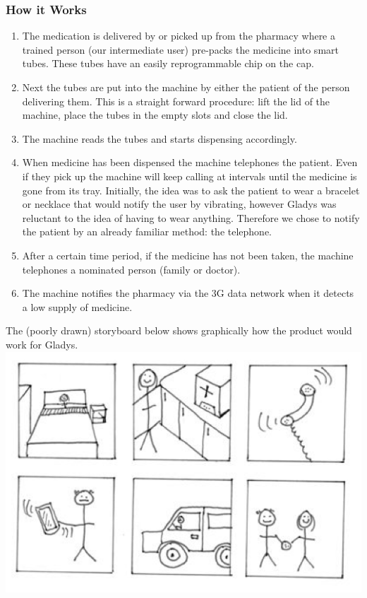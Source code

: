 \documentclass{article}
\begin{document}
	\subsubsection*{How it Works}
	\begin{enumerate}
	\item The medication is delivered by or picked up from the pharmacy where a trained person (our intermediate user) pre-packs the medicine into smart tubes. These tubes have an easily reprogrammable chip on the cap.
	\item Next the tubes are put into the machine by either the patient of the person delivering them. This is a straight forward procedure: lift the lid of the machine, place the tubes in the empty slots and close the lid.
	\item The machine reads the tubes and starts dispensing accordingly.
	\item When medicine has been dispensed the machine telephones the patient. Even if they pick up the machine will keep calling at intervals until the medicine is gone from its tray. Initially, the idea was to ask the patient to wear a bracelet or necklace that would notify the user by vibrating, however Gladys was reluctant to the idea of having to wear anything. Therefore we chose to notify the patient by an already familiar method: the telephone.
	\item After a certain time period, if the medicine has not been taken, the machine telephones a nominated person (family or doctor).
	\item The machine notifies the pharmacy via the 3G data network when it detects a low supply of medicine.
	\end{enumerate}
	
	The (poorly drawn) storyboard below shows graphically how the product would work for Gladys. \\
\includegraphics[width=\textwidth, angle=0.8,scale=0.95]{storyboard.png}
\end{document}
